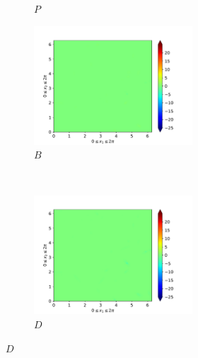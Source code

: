 \begin{figure}[H]
\begin{subfigure}{0.45\textwidth}
        \caption{$P$}
    \end{subfigure}
    \newline
    \begin{subfigure}{0.45\textwidth}
        \includegraphics[height=1.75in]{media/run-cds-65/B-ke-1340}
        \caption{$B$}
    \end{subfigure}
    ~
    \begin{subfigure}{0.45\textwidth}
        \includegraphics[height=1.75in]{media/run-cds-65/D-ke-1340}
        \caption{$D$}
    \end{subfigure}
\end{figure}

\newpage

